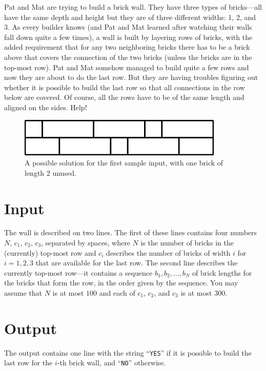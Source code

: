 
Pat and Mat are trying to build a brick wall. They have three types of
bricks---all have the same depth and height but they are of three
different widths: 1, 2, and 3. As every builder knows (and Pat and Mat
learned after watching their walls fall down quite a few times), a
wall is built by layering rows of bricks, with the added requirement
that for any two neighboring bricks there has to be a brick above that
covers the connection of the two bricks (unless the bricks are in the
top-most row). Pat and Mat somehow managed to build quite a few rows
and now they are about to do the last row. But they are having
troubles figuring out whether it is possible to build the last row so
that all connections in the row below are covered. Of course, all the
rows have to be of the same length and aligned on the sides. Help!

\begin{figure}[h]
  \centering
  \includegraphics{brickwall}
  \caption{A possible solution for the first sample input, with one brick
of length 2 unused.}
\label{fig:sample1}
\end{figure}

\section*{Input}

The wall is described
on two lines. The first of these lines contains four numbers $N$,
$c_1$, $c_2$, $c_3$, separated by spaces, where $N$ is the number of
bricks in the (currently) top-most row and $c_i$ describes the number
of bricks of width $i$ for $i = 1, 2, 3$ that are available for the
last row. The second line describes the currently top-most row---it
contains a sequence $b_1, b_2, \ldots, b_N$ of brick lengths for the
bricks that form the row, in the order given by the sequence. You may
assume that $N$ is at most $100$ and each of $c_1$, $c_2$, and $c_3$
is at most $300$.

\section*{Output}

The output contains one line with
the string ``\verb+YES+'' if it is possible to build the last row for
the $i$-th brick wall, and ``\verb+NO+'' otherwise.
